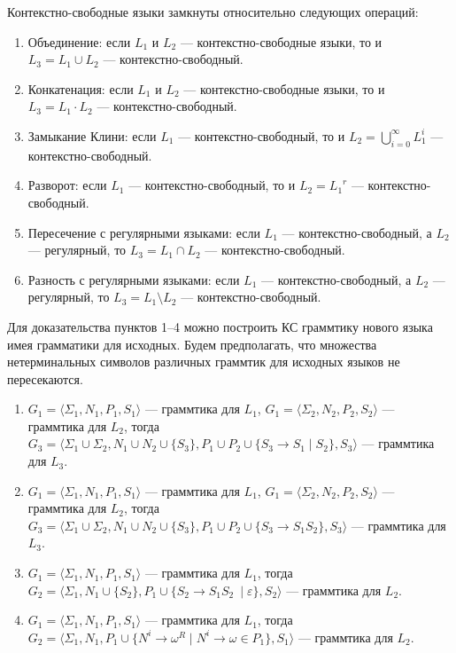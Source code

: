 \begin{theorem}
Контекстно-свободные языки замкнуты относительно следующих операций:
\begin{enumerate}
  \item Объединение: если $L_1$ и $L_2$ --- контекстно-свободные языки, то и $L_3 = L_1 \cup L_2$ --- контекстно-свободный.
  \item Конкатенация: если $L_1$ и $L_2$ --- контекстно-свободные языки, то и $L_3 = L_1 \cdot L_2$ --- контекстно-свободный.
  \item Замыкание Клини: если $L_1$ --- контекстно-свободный, то и $L_2 = \bigcup\limits_{i=0}^{\infty} L_1^i $ --- контекстно-свободный.
  \item Разворот: если $L_1$ --- контекстно-свободный, то и $L_2 = {L_1}^r$ --- контекстно-свободный.
  \item Пересечение с регулярными языками: если $L_1$ --- контекстно-свободный, а $L_2$ --- регулярный, то  $L_3 = L_1 \cap L_2$ --- контекстно-свободный.
  \item Разность с регулярными языками: если $L_1$ --- контекстно-свободный, а $L_2$ --- регулярный, то  $L_3 = L_1 \setminus L_2$ --- контекстно-свободный.
\end{enumerate}
\end{theorem}
Для доказательства пунктов 1--4 можно построить КС граммтику нового языка имея грамматики для исходных. 
Будем предполагать, что множества нетерминальных символов различных граммтик для исходных языков не пересекаются.
\begin{enumerate}
\item $G_1=\langle\Sigma_1,N_1,P_1,S_1\rangle$ --- граммтика для $L_1$, $G_1=\langle\Sigma_2,N_2,P_2,S_2\rangle$ --- граммтика для $L_2$, тогда $G_3=\langle\Sigma_1 \cup \Sigma_2, N_1 \cup N_2 \cup \{S_3\}, P_1 \cup P_2 \cup \{S_3 \to S_1 \mid S_2\} ,S_3\rangle$ --- граммтика для $L_3$. 
\item $G_1=\langle\Sigma_1,N_1,P_1,S_1\rangle$ --- граммтика для $L_1$, $G_1=\langle\Sigma_2,N_2,P_2,S_2\rangle$ --- граммтика для $L_2$, тогда $G_3=\langle\Sigma_1 \cup \Sigma_2, N_1 \cup N_2 \cup \{S_3\}, P_1 \cup P_2 \cup \{S_3 \to S_1 S_2\} ,S_3\rangle$ --- граммтика для $L_3$. 
\item $G_1=\langle\Sigma_1,N_1,P_1,S_1\rangle$ --- граммтика для $L_1$, тогда $G_2=\langle\Sigma_1, N_1 \cup \{S_2\}, P_1 \cup \{S_2 \to S_1 S_2\ \mid \varepsilon\}, S_2\rangle$ --- граммтика для $L_2$. 
\item $G_1=\langle\Sigma_1,N_1,P_1,S_1\rangle$ --- граммтика для $L_1$, тогда $G_2=\langle\Sigma_1, N_1, P_1 \cup \{N^i \to \omega^R \mid N^i \to \omega \in P_1 \}, S_1\rangle$ --- граммтика для $L_2$. 
\end{enumerate}


